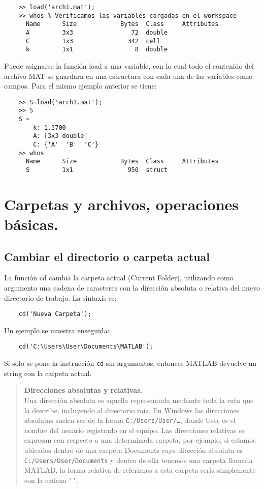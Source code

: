 \begin{verbatim}
	>> load('arch1.mat');
	>> whos % Verificamos las variables cargadas en el workspace
	  Name      Size            Bytes  Class     Attributes
	  A         3x3                72  double              
	  C         1x3               342  cell                
	  k         1x1                 8  double       
\end{verbatim}

Puede asignarse la función load a una variable, con lo cual todo el contenido del 
archivo MAT se guardara en una estructura con cada una de las variables como campos. 
Para el mismo ejemplo anterior se tiene:

\begin{verbatim}
	>> S=load('arch1.mat');
	>> S
	S = 
	    k: 1.3700
	    A: [3x3 double]
	    C: {'A'  'B'  'C'}
	>> whos 
	  Name      Size            Bytes  Class     Attributes
	  S         1x1               950  struct       
\end{verbatim}


\section{Carpetas y archivos, operaciones básicas.}

\subsection{Cambiar el directorio o carpeta actual}

La función cd cambia la carpeta actual (Current Folder), utilizando como argumento 
una cadena de caracteres con la dirección absoluta o relativa del nuevo directorio 
de trabajo. La sintaxis es:

\begin{verbatim}
	cd('Nueva Carpeta');
\end{verbatim}

Un ejemplo se muestra enseguida:

\begin{verbatim}
	cd('C:\Users\User\Documents\MATLAB');
\end{verbatim}

Si solo se pone la instrucción \texttt{cd} sin argumentos, entonces MATLAB devuelve un 
string con la carpeta actual.

\begin{quote}
\textbf{Direcciones absolutas y relativas}.\\
Una dirección absoluta es aquella representada mediante toda la ruta que la describe, 
incluyendo al directorio raíz. En Windows las direcciones absolutas suelen ser de la forma 
\texttt{C:/Users/User/…}, donde User es el nombre del usuario registrado en el equipo.
Las direcciones relativas se expresan con respecto a una determinada carpeta, por ejemplo, 
si estamos ubicados dentro de una carpeta Documents cuya dirección absoluta es 
\texttt{C:/Users/User/Documents} y dentro de ella tenemos una carpeta llamada MATLAB, la forma 
relativa de referirnos a esta carpeta sería simplemente con la cadena \texttt{'\MATLAB'}.
\end{quote}

